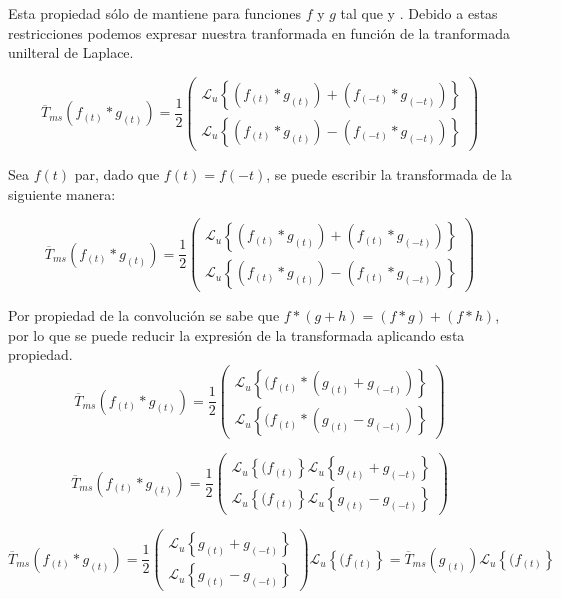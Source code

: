 \documentclass[12pt]{article}
\begin{document}
Esta propiedad sólo de mantiene para funciones $f$ y $g$ tal que   y  . Debido a estas restricciones podemos expresar nuestra tranformada en función de la tranformada unilteral de Laplace.

$$
\overline{T}_{ms}(f_{(t)} * g_{(t)}) = \frac12
\begin{pmatrix}
\mathcal{L}_u\left\{(f_{(t)} * g_{(t)}) + (f_{(-t)} * g_{(-t)})\right\}\\[0.2 cm]
\mathcal{L}_u\left\{(f_{(t)} * g_{(t)}) - (f_{(-t)} * g_{(-t)})\right\}
\end{pmatrix}
$$

Sea $f(t)$ par, dado que $f(t) = f(-t)$, se puede escribir la transformada de la siguiente manera:

$$
\overline{T}_{ms}(f_{(t)} * g_{(t)}) = \frac12
\begin{pmatrix}
\mathcal{L}_u\left\{(f_{(t)} * g_{(t)}) + (f_{(t)} * g_{(-t)})\right\}\\[0.2 cm]
\mathcal{L}_u\left\{(f_{(t)} * g_{(t)}) - (f_{(t)} * g_{(-t)})\right\}
\end{pmatrix}
$$

Por propiedad de la convolución se sabe que $f * (g +h) = (f*g) + (f*h)$, por lo que se puede reducir la expresión de la transformada aplicando esta propiedad.
$$
\overline{T}_{ms}(f_{(t)} * g_{(t)}) = \frac12
\begin{pmatrix}
\mathcal{L}_u\left\{(f_{(t)} * (g_{(t)}+ g_{(-t)})\right\}\\[0.2 cm]
\mathcal{L}_u\left\{(f_{(t)} * ( g_{(t)} - g_{(-t)})\right\}
\end{pmatrix}
$$

$$
\overline{T}_{ms}(f_{(t)} * g_{(t)}) = \frac12
\begin{pmatrix}
\mathcal{L}_u\left\{(f_{(t)} \right\} \mathcal{L}_u\left\{ g_{(t)}+ g_{(-t)}\right\}\\[0.2 cm]
\mathcal{L}_u\left\{(f_{(t)} \right\} \mathcal{L}_u\left\{ g_{(t)} - g_{(-t)}\right\}
\end{pmatrix}
$$

$$
\overline{T}_{ms}(f_{(t)} * g_{(t)}) = \frac12
\begin{pmatrix}
 \mathcal{L}_u\left\{ g_{(t)}+ g_{(-t)}\right\}\\[0.2 cm]
\mathcal{L}_u\left\{ g_{(t)} - g_{(-t)}\right\}
\end{pmatrix} \mathcal{L}_u\left\{(f_{(t)} \right\}  =\overline{T}_{ms}( g_{(t)})  \mathcal{L}_u\left\{(f_{(t)} \right\}
$$
\end{document}
